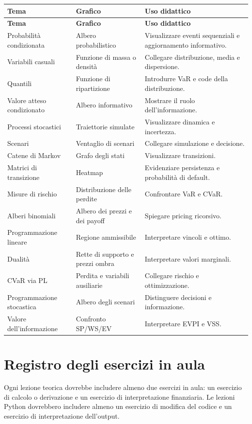 \documentclass[12pt,a4paper]{article}%
\begin{document}
\begin{longtable}{p{4.0cm}p{4.2cm}p{6.1cm}}
\hline
\textbf{Tema} & \textbf{Grafico} & \textbf{Uso didattico} \\
\hline
\endfirsthead
\hline
\textbf{Tema} & \textbf{Grafico} & \textbf{Uso didattico} \\
\hline
\endhead
Probabilit\`{a} condizionata & Albero probabilistico & Visualizzare eventi sequenziali e aggiornamento informativo. \\
Variabili casuali & Funzione di massa o densit\`{a} & Collegare distribuzione, media e dispersione. \\
Quantili & Funzione di ripartizione & Introdurre VaR e code della distribuzione. \\
Valore atteso condizionato & Albero informativo & Mostrare il ruolo dell'informazione. \\
Processi stocastici & Traiettorie simulate & Visualizzare dinamica e incertezza. \\
Scenari & Ventaglio di scenari & Collegare simulazione e decisione. \\
Catene di Markov & Grafo degli stati & Visualizzare transizioni. \\
Matrici di transizione & Heatmap & Evidenziare persistenza e probabilit\`{a} di default. \\
Misure di rischio & Distribuzione delle perdite & Confrontare VaR e CVaR. \\
Alberi binomiali & Albero dei prezzi e dei payoff & Spiegare pricing ricorsivo. \\
Programmazione lineare & Regione ammissibile & Interpretare vincoli e ottimo. \\
Dualit\`{a} & Rette di supporto e prezzi ombra & Interpretare valori marginali. \\
CVaR via PL & Perdita e variabili ausiliarie & Collegare rischio e ottimizzazione. \\
Programmazione stocastica & Albero degli scenari & Distinguere decisioni e informazione. \\
Valore dell'informazione & Confronto SP/WS/EV & Interpretare EVPI e VSS. \\
\hline
\end{longtable}


\section{Registro degli esercizi in aula}

Ogni lezione teorica dovrebbe includere almeno due esercizi in aula: un
esercizio di calcolo o derivazione e un esercizio di interpretazione
finanziaria. Le lezioni Python dovrebbero includere almeno un esercizio di
modifica del codice e un esercizio di interpretazione dell'output.
\end{document}
